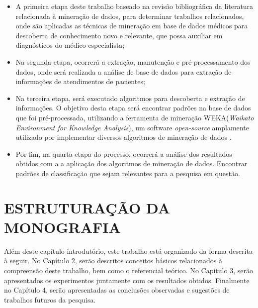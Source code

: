 \documentclass[
	12pt,				%
	openright,			%
	oneside,	
	a4paper,				%
	english,				%
	brazil				%
]{abntex2/abntex2} %
\begin{document}
		\begin{itemize}
			
			\item A primeira etapa deste trabalho baseado na revisão bibliográfica da literatura relacionada à mineração de dados, para determinar trabalhos relacionados, onde são aplicadas as técnicas de mineração em base de dados médicos para descoberta de conhecimento novo e relevante, que possa auxiliar em diagnósticos do médico especialista;
			
			\item Na segunda etapa, ocorrerá a extração, manutenção e pré-processamento dos dados, onde será realizada a análise  de base de dados para extração de informações de atendimentos de pacientes;
			
			\item Na terceira etapa, será executado algoritmos para descoberta e extração de informações. O objetivo desta etapa será encontrar padrões na base de dados que foi pré-processada, utilizando a ferramenta de mineração WEKA(\textit{Waikato Environment for Knowledge Analysis}), um software \textit{open-source} \cite{opensource:2015} amplamente utilizado por implementar diversos algoritmos de mineração de dados \cite{hall:2009}.
			
			
			\item Por fim,  na quarta etapa do processo, ocorrerá a análise dos resultados obtidos com a a aplicação dos algoritmos de mineração de dados. Encontrar padrões de classificação que sejam relevantes para a pesquisa em questão.
			
		\end{itemize}
	
	\vspace{-1.5\baselineskip}
	\section{ESTRUTURAÇÃO DA MONOGRAFIA}
	\vspace{1\baselineskip}
		Além deste capítulo introdutório, este trabalho está organizado da forma descrita à seguir. No Capítulo 2, serão descritos conceitos básicos relacionados à compreensão deste trabalho, bem como o referencial teórico. No Capítulo 3, serão apresentados os experimentos juntamente com os resultados obtidos. Finalmente no Capítulo 4, serão apresentadas as conclusões observadas e sugestões de trabalhos futuros da pesquisa.
\end{document}
